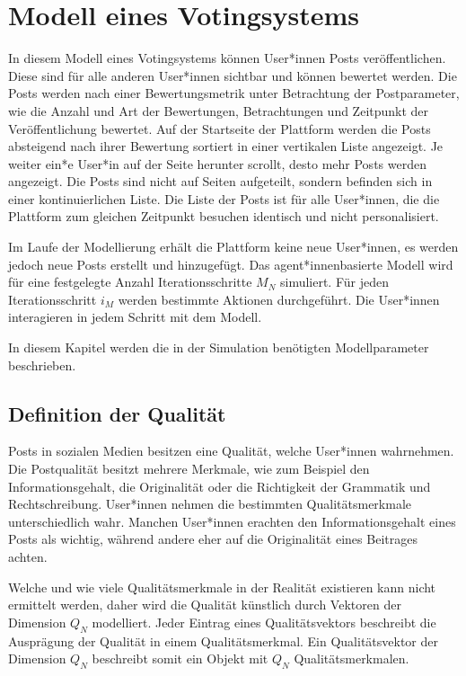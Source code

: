 \chapter{Modell eines Votingsystems}
\label{chapter:modell}

In diesem Modell eines Votingsystems können User*innen Posts veröffentlichen. Diese sind für alle anderen User*innen sichtbar und können bewertet werden. Die Posts werden nach einer Bewertungsmetrik unter Betrachtung der Postparameter, wie die Anzahl und Art der Bewertungen, Betrachtungen und Zeitpunkt der Veröffentlichung bewertet. Auf der Startseite der Plattform werden die Posts absteigend nach ihrer Bewertung sortiert in einer vertikalen Liste angezeigt. Je weiter ein*e User*in auf der Seite herunter scrollt, desto mehr Posts werden angezeigt. Die Posts sind nicht auf Seiten aufgeteilt, sondern befinden sich in einer kontinuierlichen Liste. Die Liste der Posts ist für alle User*innen, die die Plattform zum gleichen Zeitpunkt besuchen identisch und nicht personalisiert.

Im Laufe der Modellierung erhält die Plattform keine neue User*innen, es werden jedoch neue Posts erstellt und hinzugefügt.
Das agent*innenbasierte Modell wird für eine festgelegte Anzahl Iterationsschritte $M_N$ simuliert. Für jeden Iterationsschritt $i_M$ werden bestimmte Aktionen durchgeführt. Die User*innen interagieren in jedem Schritt mit dem Modell.

In diesem Kapitel werden die in der Simulation benötigten Modellparameter beschrieben.

\section{Definition der Qualität}

Posts in sozialen Medien besitzen eine Qualität, welche User*innen wahrnehmen. Die Postqualität besitzt mehrere Merkmale, wie zum Beispiel den Informationsgehalt, die Originalität oder die Richtigkeit der Grammatik und Rechtschreibung. User*innen nehmen die bestimmten Qualitätsmerkmale unterschiedlich wahr. Manchen User*innen erachten den Informationsgehalt eines Posts als wichtig, während andere eher auf die Originalität eines Beitrages achten.

Welche und wie viele Qualitätsmerkmale in der Realität existieren kann nicht ermittelt werden, daher wird die Qualität künstlich durch Vektoren der Dimension $Q_N$ modelliert. Jeder Eintrag eines Qualitätsvektors beschreibt die Ausprägung der Qualität in einem Qualitätsmerkmal. Ein Qualitätsvektor der Dimension $Q_N$ beschreibt somit ein Objekt mit $Q_N$ Qualitätsmerkmalen. 

